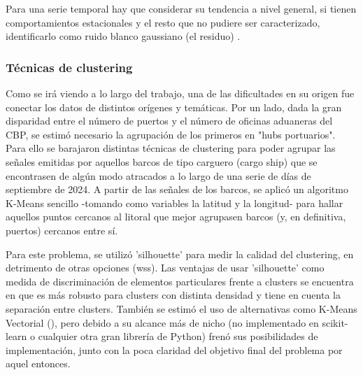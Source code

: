 \documentclass[12pt]{article}
\begin{document}
		Para una serie temporal hay que considerar su tendencia a nivel general, si tienen comportamientos estacionales y el resto que no pudiere ser caracterizado, identificarlo como ruido blanco gaussiano (el residuo) \cite{towardsdatascience2025timeseries}.
		

		\subsubsection{\label{clustering}Técnicas de clustering}
		Como se irá viendo a lo largo del trabajo, una de las dificultades en su origen fue conectar los datos de distintos orígenes y temáticas. Por un lado, dada la gran disparidad entre el número de puertos y el número de oficinas aduaneras del CBP, se estimó necesario la agrupación de los primeros en "hubs portuarios". Para ello se barajaron distintas técnicas de clustering para poder agrupar las señales emitidas por aquellos barcos de tipo carguero (cargo ship) que se encontrasen de algún modo atracados a lo largo de una serie de días de septiembre de 2024. A partir de las señales de los barcos, se aplicó un algoritmo K-Means sencillo -tomando como variables la latitud y la longitud- para hallar aquellos puntos cercanos al litoral que mejor agrupasen barcos (y, en definitiva, puertos) cercanos entre sí.
		
		Para este problema, se utilizó 'silhouette' para medir la calidad del clustering, en detrimento de otras opciones (wss). Las ventajas de usar 'silhouette' como medida de discriminación de elementos particulares frente a clusters se encuentra en que es más robusto para clusters con distinta densidad y tiene en cuenta la separación entre clusters. También se estimó el uso de alternativas como K-Means Vectorial (\cite{ferreira2012vectorfieldkmeansclustering}), pero debido a su alcance más de nicho (no implementado en scikit-learn o cualquier otra gran librería de Python) frenó sus posibilidades de implementación, junto con la poca claridad del objetivo final del problema por aquel entonces.	
	
\end{document}
